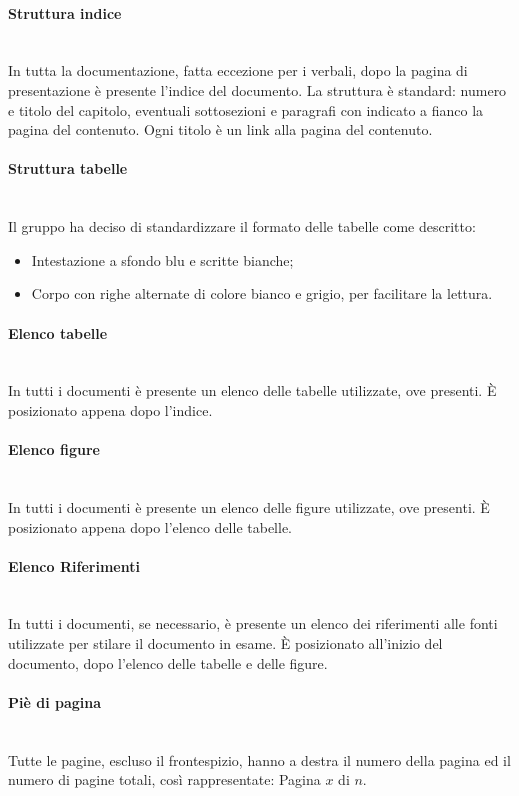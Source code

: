 \paragraph{Struttura indice} \-\\
In tutta la documentazione, fatta eccezione per i verbali, dopo la pagina di presentazione è presente l'indice del documento. La struttura è standard: numero e titolo del capitolo, eventuali sottosezioni e paragrafi con indicato a fianco la pagina del contenuto. Ogni titolo è un link alla pagina del contenuto. 

\paragraph{Struttura tabelle} \-\\
Il gruppo ha deciso di standardizzare il formato delle tabelle come descritto:
\begin{itemize}
	\item Intestazione a sfondo blu e scritte bianche;
	\item Corpo con righe alternate di colore bianco e grigio, per facilitare la lettura.
\end{itemize}

\paragraph{Elenco tabelle} \-\\
In tutti i documenti è presente un elenco delle tabelle utilizzate, ove presenti. È posizionato appena dopo l'indice.  

\paragraph{Elenco figure} \-\\
In tutti i documenti è presente un elenco delle figure utilizzate, ove presenti. È posizionato appena dopo l'elenco delle tabelle.

\paragraph{Elenco Riferimenti} \-\\
In tutti i documenti, se necessario, è presente un elenco dei riferimenti alle fonti utilizzate per stilare il documento in esame. È posizionato all'inizio del documento, dopo l'elenco delle tabelle e delle figure.

\paragraph{Piè di pagina} \-\\ 
Tutte le pagine, escluso il frontespizio, hanno a destra il numero della pagina ed il numero di pagine totali, così rappresentate: Pagina $x$ di $n$.

